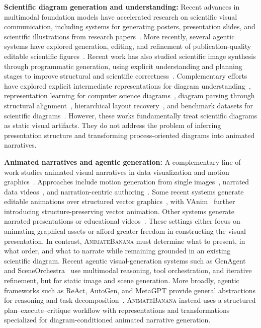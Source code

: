 \documentclass{article} %
\begin{document}
\noindent\textbf{Scientific diagram generation and understanding:}
Recent advances in multimodal foundation models have accelerated research on scientific visual communication, including systems for generating posters, presentation slides, and scientific illustrations from research papers~\citep{posteragent,pptagent,ge2025autopresent,shi-etal-2025-presentagent}. More recently, several agentic systems have explored generation, editing, and refinement of publication-quality editable scientific figures~\citep{paperbanana,figagent,autofigure,scifig,livefigure,vfig}. Recent work has also studied scientific image synthesis through programmatic generation, using explicit understanding and planning stages to improve structural and scientific correctness~\citep{lin2026scientific}. Complementary efforts have explored explicit intermediate representations for diagram understanding~\citep{explicitdiagram}, representation learning for computer science diagrams~\citep{rlcsdia}, diagram parsing through structural alignment~\citep{alignmentdiagram}, hierarchical layout recovery~\citep{layoutrecovery}, and benchmark datasets for scientific
diagrams~\citep{diagrambank}. However, these works fundamentally treat scientific diagrams as static visual artifacts. They do not address the problem of inferring presentation structure and transforming process-oriented diagrams into animated narratives.



\noindent\textbf{Animated narratives and agentic generation:}
A complementary line of work studies animated visual narratives in data visualization and motion graphics~\citep{dataplayer,dataplaywright,narrativeplayer,zheng2025designspace}. Approaches include motion generation from single images~\citep{mggen}, narrated data videos~\citep{dataplayer,
dataplaywright,narrativeplayer}, and narration-centric authoring~\citep{wonderflow}. Some recent systems generate editable animations over structured vector graphics~\citep{keyframer,logomotion}, with VAnim~\citep{liang2026vanim} further introducing structure-preserving vector
animation. Other systems generate narrated presentations or educational videos~\citep{shi-etal-2025-presentagent,code2video}. These settings either focus on animating graphical assets or afford greater freedom in constructing the visual presentation. In contrast, \textsc{AnimateBanana} must determine
what to present, in what order, and what to narrate while remaining grounded in an existing scientific diagram. Recent agentic visual-generation systems such as GenAgent~\citep{jiang2026genagent} and SceneOrchestra~\citep{he2026sceneorchestra} use multimodal reasoning, tool orchestration, and iterative refinement, but for static image and scene generation. More broadly, agentic frameworks such as ReAct, AutoGen, and MetaGPT provide general abstractions for
reasoning and task decomposition~\citep{yao2023react,wu2024autogen,hong2024metagpt}. \textsc{AnimateBanana} instead uses a structured plan--execute--critique workflow with representations and transformations specialized for diagram-conditioned animated narrative generation.
\end{document}
